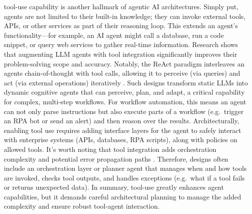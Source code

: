 tool-use capability is another hallmark of agentic AI architectures. Simply put, agents are not limited to their built-in knowledge; they can invoke external tools, APIs, or other services as part of their reasoning loop. This extends an agent's functionality—for example, an AI agent might call a database, run a code snippet, or query web services to gather real-time information. Research shows that augmenting LLM agents with tool integration significantly improves their problem-solving scope and accuracy. Notably, the ReAct paradigm interleaves an agents chain-of-thought with tool calls, allowing it to perceive (via queries) and act (via external operations) iteratively \parencite{yaoReAct2023}. Such designs transform static LLMs into dynamic cognitive agents that can perceive, plan, and adapt, a critical capability for complex, multi-step workflows. For workflow automation, this means an agent can not only parse instructions but also execute parts of a workflow (e.g.~trigger an RPA bot or send an alert) and then reason over the results. Architecturally, enabling tool use requires adding interface layers for the agent to safely interact with enterprise systems (APIs, databases, RPA scripts), along with policies on allowed tools. It's worth noting that tool integration adds orchestration complexity and potential error propagation paths \parencite{sapkotaAI2026}. Therefore, designs often include an orchestration layer or planner agent that manages when and how tools are invoked, checks tool outputs, and handles exceptions (e.g.~what if a tool fails or returns unexpected data). In summary, tool-use greatly enhances agent capabilities, but it demands careful architectural planning to manage the added complexity and ensure robust tool-agent interaction.

